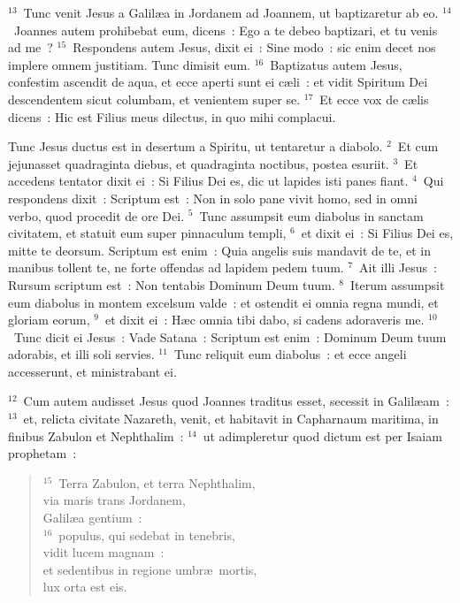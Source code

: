 ${}^{13}$~Tunc venit Jesus a Galil\ae a in Jordanem ad Joannem, ut baptizaretur ab eo.
${}^{14}$~Joannes autem prohibebat eum, dicens~: Ego a te debeo baptizari, et tu venis ad me~?
${}^{15}$~Respondens autem Jesus, dixit ei~: Sine modo~: sic enim decet nos implere omnem justitiam. Tunc dimisit eum.
${}^{16}$~Baptizatus autem Jesus, confestim ascendit de aqua, et ecce aperti sunt ei c\ae li~: et vidit Spiritum Dei descendentem sicut columbam, et venientem super se.
${}^{17}$~Et ecce vox de c\ae lis dicens~: Hic est Filius meus dilectus, in quo mihi complacui.

\lettrine[lines=10,image=true,loversize=0.05,lraise=-0.03]{T}{}unc Jesus ductus est in desertum a Spiritu, ut tentaretur a diabolo.
${}^{2}$~Et cum jejunasset quadraginta diebus, et quadraginta noctibus, postea esuriit.
${}^{3}$~Et accedens tentator dixit ei~: Si Filius Dei es, dic ut lapides isti panes fiant.
${}^{4}$~Qui respondens dixit~: Scriptum est~: Non in solo pane vivit homo, sed in omni verbo, quod procedit de ore Dei.
${}^{5}$~Tunc assumpsit eum diabolus in sanctam civitatem, et statuit eum super pinnaculum templi,
${}^{6}$~et dixit ei~: Si Filius Dei es, mitte te deorsum. Scriptum est enim~: Quia angelis suis mandavit de te, et in manibus tollent te, ne forte offendas ad lapidem pedem tuum.
${}^{7}$~Ait illi Jesus~: Rursum scriptum est~: Non tentabis Dominum Deum tuum.
${}^{8}$~Iterum assumpsit eum diabolus in montem excelsum valde~: et ostendit ei omnia regna mundi, et gloriam eorum,
${}^{9}$~et dixit ei~: H\ae c omnia tibi dabo, si cadens adoraveris me.
${}^{10}$~Tunc dicit ei Jesus~: Vade Satana~: Scriptum est enim~: Dominum Deum tuum adorabis, et illi soli servies.
${}^{11}$~Tunc reliquit eum diabolus~: et ecce angeli accesserunt, et ministrabant ei.


${}^{12}$~Cum autem audisset Jesus quod Joannes traditus esset, secessit in Galil\ae am~:
${}^{13}$~et, relicta civitate Nazareth, venit, et habitavit in Capharnaum maritima, in finibus Zabulon et Nephthalim~:
${}^{14}$~ut adimpleretur quod dictum est per Isaiam prophetam~:
\begin{flushleft}\begin{verse}${}^{15}$~Terra Zabulon, et terra Nephthalim,\\ via maris trans Jordanem,\\ Galil\ae a gentium~:\\
${}^{16}$~populus, qui sedebat in tenebris,\\ vidit lucem magnam~:\\ et sedentibus in regione umbr\ae\ mortis,\\ lux orta est eis.\end{verse}\end{flushleft}


